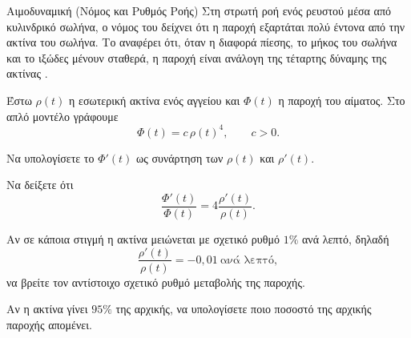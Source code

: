 \begin{problhma}{Αιμοδυναμική (Νόμος  και Ρυθμός Ροής)}
Στη στρωτή ροή ενός ρευστού μέσα από κυλινδρικό σωλήνα, ο νόμος του
 δείχνει ότι η παροχή εξαρτάται πολύ έντονα από την
ακτίνα του σωλήνα. Το  αναφέρει ότι, όταν
η διαφορά πίεσης, το μήκος του σωλήνα και το ιξώδες μένουν σταθερά, η
παροχή είναι ανάλογη της τέταρτης δύναμης της ακτίνας
\cite{openstaxCollegePhysicsPoiseuille}.

Έστω \(\rho(t)\) η εσωτερική ακτίνα ενός αγγείου και \(\Phi(t)\) η
παροχή του αίματος. Στο απλό μοντέλο  γράφουμε
\[
  \Phi(t)=c\,\rho(t)^4,
  \qquad c>0.
\]
\begin{alist}
  \item Να υπολογίσετε το \(\Phi'(t)\) ως συνάρτηση των
        \(\rho(t)\) και \(\rho'(t)\).
  \item Να δείξετε ότι
        \[
          \frac{\Phi'(t)}{\Phi(t)}
          =
          4\frac{\rho'(t)}{\rho(t)}.
        \]
  \item Αν σε κάποια στιγμή η ακτίνα μειώνεται με σχετικό ρυθμό
        \(1\%\) ανά λεπτό, δηλαδή
        \[
          \frac{\rho'(t)}{\rho(t)}=-0{,}01\ \text{ανά λεπτό},
        \]
        να βρείτε τον αντίστοιχο σχετικό ρυθμό μεταβολής της παροχής.
  \item Αν η ακτίνα γίνει \(95\%\) της αρχικής, να υπολογίσετε ποιο
        ποσοστό της αρχικής παροχής απομένει.
\end{alist}

\begin{center}
\end{center}
\end{problhma}
